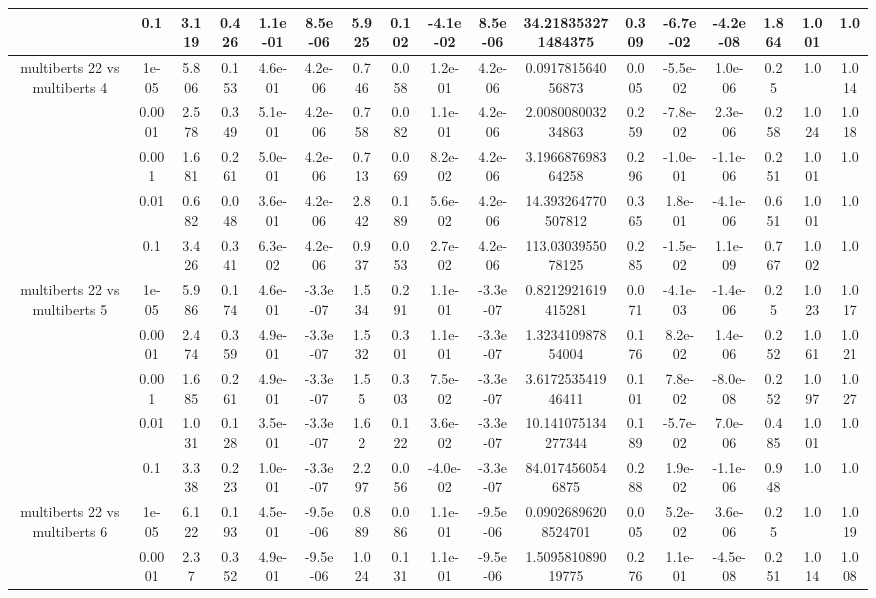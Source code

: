 \begin{tabular}{|c|c|c|c|c|c|c|c|c|c|c|c|c|c|c|c|c|}
 & 0.1 & 3.119 & 0.426 & 1.1e-01 & 8.5e-06 & 5.925 & 0.102 & -4.1e-02 & 8.5e-06 & 34.218353271484375 & 0.309 & -6.7e-02 & -4.2e-08 & 1.864 & 1.001 & 1.0 \\
\hline
\multirow{5}{*}{multiberts 22 vs multiberts 4} & 1e-05 & 5.806 & 0.153 & 4.6e-01 & 4.2e-06 & 0.746 & 0.058 & 1.2e-01 & 4.2e-06 & 0.091781564056873 & 0.005 & -5.5e-02 & 1.0e-06 & 0.25 & 1.0 & 1.014 \\
 & 0.0001 & 2.578 & 0.349 & 5.1e-01 & 4.2e-06 & 0.758 & 0.082 & 1.1e-01 & 4.2e-06 & 2.008008003234863 & 0.259 & -7.8e-02 & 2.3e-06 & 0.258 & 1.024 & 1.018 \\
 & 0.001 & 1.681 & 0.261 & 5.0e-01 & 4.2e-06 & 0.713 & 0.069 & 8.2e-02 & 4.2e-06 & 3.196687698364258 & 0.296 & -1.0e-01 & -1.1e-06 & 0.251 & 1.001 & 1.0 \\
 & 0.01 & 0.682 & 0.048 & 3.6e-01 & 4.2e-06 & 2.842 & 0.189 & 5.6e-02 & 4.2e-06 & 14.393264770507812 & 0.365 & 1.8e-01 & -4.1e-06 & 0.651 & 1.001 & 1.0 \\
 & 0.1 & 3.426 & 0.341 & 6.3e-02 & 4.2e-06 & 0.937 & 0.053 & 2.7e-02 & 4.2e-06 & 113.0303955078125 & 0.285 & -1.5e-02 & 1.1e-09 & 0.767 & 1.002 & 1.0 \\
\hline
\multirow{5}{*}{multiberts 22 vs multiberts 5} & 1e-05 & 5.986 & 0.174 & 4.6e-01 & -3.3e-07 & 1.534 & 0.291 & 1.1e-01 & -3.3e-07 & 0.8212921619415281 & 0.071 & -4.1e-03 & -1.4e-06 & 0.25 & 1.023 & 1.017 \\
 & 0.0001 & 2.474 & 0.359 & 4.9e-01 & -3.3e-07 & 1.532 & 0.301 & 1.1e-01 & -3.3e-07 & 1.323410987854004 & 0.176 & 8.2e-02 & 1.4e-06 & 0.252 & 1.061 & 1.021 \\
 & 0.001 & 1.685 & 0.261 & 4.9e-01 & -3.3e-07 & 1.55 & 0.303 & 7.5e-02 & -3.3e-07 & 3.617253541946411 & 0.101 & 7.8e-02 & -8.0e-08 & 0.252 & 1.097 & 1.027 \\
 & 0.01 & 1.031 & 0.128 & 3.5e-01 & -3.3e-07 & 1.62 & 0.122 & 3.6e-02 & -3.3e-07 & 10.141075134277344 & 0.189 & -5.7e-02 & 7.0e-06 & 0.485 & 1.001 & 1.0 \\
 & 0.1 & 3.338 & 0.223 & 1.0e-01 & -3.3e-07 & 2.297 & 0.056 & -4.0e-02 & -3.3e-07 & 84.0174560546875 & 0.288 & 1.9e-02 & -1.1e-06 & 0.948 & 1.0 & 1.0 \\
\hline
\multirow{5}{*}{multiberts 22 vs multiberts 6} & 1e-05 & 6.122 & 0.193 & 4.5e-01 & -9.5e-06 & 0.889 & 0.086 & 1.1e-01 & -9.5e-06 & 0.09026896208524701 & 0.005 & 5.2e-02 & 3.6e-06 & 0.25 & 1.0 & 1.019 \\
 & 0.0001 & 2.37 & 0.352 & 4.9e-01 & -9.5e-06 & 1.024 & 0.131 & 1.1e-01 & -9.5e-06 & 1.509581089019775 & 0.276 & 1.1e-01 & -4.5e-08 & 0.251 & 1.014 & 1.008 \\

\end{tabular}
